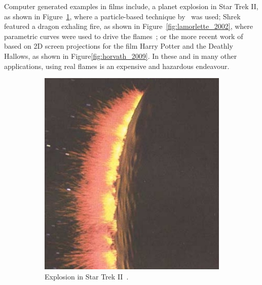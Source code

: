 Computer generated examples in films include, a planet explosion in Star Trek II, as shown in Figure~\ref{fig:reeves_1983}, where a particle-based technique by~\cite{Reeves:1983} was used; Shrek featured a dragon exhaling fire, as shown in Figure~\ref{fig:lamorlette_2002}, where parametric curves were used to drive the flames~\cite{Lamorlette:2002}; or the more recent work of~\cite{Horvath:2009} based on 2D screen projections for the film Harry Potter and the Deathly Hallows, as shown in Figure\ref{fig:horvath_2009}.
In these and in many other applications, using real flames is an expensive and hazardous endeavour.

\begin{figure}[htpb!]
        \centering
        \begin{subfigure}[t]{0.29\textwidth}
                \includegraphics[width=\textwidth]{img/reeves_1983}
                \caption{Explosion in Star Trek II~\cite{Reeves:1983}.}
                \label{fig:reeves_1983}
        \end{subfigure}%
        \quad %
        \begin{subfigure}[t]{0.5\textwidth}

\end{subfigure}
\end{figure}
